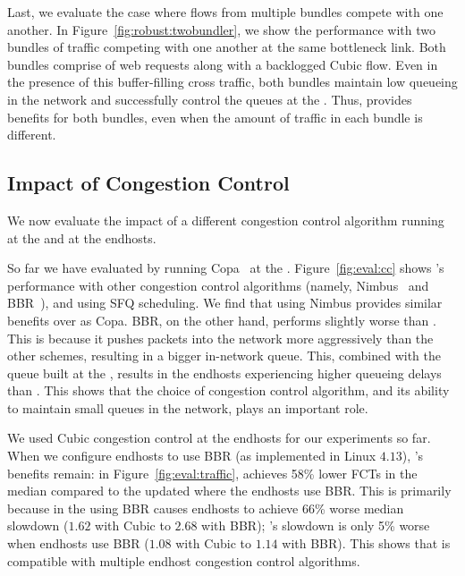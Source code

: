 
 Last, we evaluate the case where flows from multiple bundles compete with one another. 
In Figure~\ref{fig:robust:twobundler}, we show the performance with two bundles of traffic competing with one another at the same bottleneck link. 
Both bundles comprise of web requests along with a backlogged Cubic flow. 
Even in the presence of this buffer-filling cross traffic, both bundles maintain low queueing in the network and successfully control the queues at the \inbox.
Thus, \name provides benefits for both bundles, even when the amount of traffic in each bundle is different.  

\subsection{Impact of Congestion Control}\label{s:eval:cc}

We now evaluate the impact of a different congestion control algorithm running at the \inbox and at the endhosts.



 So far we have evaluated \name by running Copa~\cite{copa} at the \inbox.  
Figure~\ref{fig:eval:cc} shows \name's performance with other congestion control algorithms (namely, Nimbus~\cite{nimbus} and BBR~\cite{bbr}), and using SFQ scheduling. 
We find that using Nimbus provides similar benefits over \baseline as Copa. 
BBR, on the other hand, performs slightly worse than \baseline. 
This is because it pushes packets into the network more aggressively than the other schemes, resulting in a bigger in-network queue.
This, combined with the queue built at the \name, results in the endhosts experiencing higher queueing delays than \baseline. This shows that the choice of congestion control algorithm, and its ability to maintain small queues in the network, plays an important role. 


We used Cubic congestion control at the endhosts for our experiments so far. When we configure endhosts to use BBR (as implemented in Linux $4.13$), \name's benefits remain: in Figure~\ref{fig:eval:traffic}, \name achieves 58\% lower FCTs in the median compared to the updated \baseline where the endhosts use BBR. 
This is primarily because in the \baseline using BBR causes endhosts to achieve 66\% worse median slowdown ($1.62$ with Cubic to $2.68$ with BBR); \name's slowdown is only 5\% worse when endhosts use BBR ($1.08$ with Cubic to $1.14$ with BBR). 
This shows that \name is compatible with multiple endhost congestion control algorithms.
